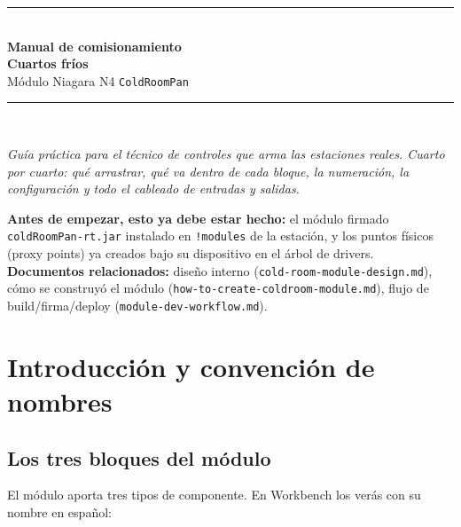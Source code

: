 \documentclass[11pt,a4paper]{article}
\newcommand{\code}[1]{\texttt{#1}}
\begin{document}
\begin{titlepage}
\centering
\vspace*{2.2cm}
{\color{frio}\rule{\linewidth}{2pt}}\\[10pt]
{\Huge\bfseries\color{tinta} Manual de comisionamiento}\\[10pt]
{\LARGE\bfseries\color{frio} Cuartos fríos}\\[6pt]
{\large\color{gris} Módulo Niagara N4 \code{ColdRoomPan}}\\[8pt]
{\color{frio}\rule{\linewidth}{2pt}}\\[26pt]

\begin{minipage}{0.82\linewidth}\color{gris}\itshape\centering
Guía práctica para el técnico de controles que arma las estaciones reales.
Cuarto por cuarto: qué arrastrar, qué va dentro de cada bloque, la numeración,
la configuración y todo el cableado de entradas y salidas.
\end{minipage}

\vfill
\begin{minipage}{0.9\linewidth}\small\color{gris}
\textbf{Antes de empezar, esto ya debe estar hecho:} el módulo firmado
\code{coldRoomPan-rt.jar} instalado en \code{!modules} de la estación, y los puntos
físicos (proxy points) ya creados bajo su dispositivo en el árbol de drivers.\\[6pt]
\textbf{Documentos relacionados:} diseño interno (\code{cold-room-module-design.md}),
cómo se construyó el módulo (\code{how-to-create-coldroom-module.md}),
flujo de build/firma/deploy (\code{module-dev-workflow.md}).
\end{minipage}
\vspace{1.4cm}
\end{titlepage}

\tableofcontents
\clearpage

\section{Introducción y convención de nombres}

\subsection{Los tres bloques del módulo}
El módulo aporta tres tipos de componente. En Workbench los verás con su nombre en español:
\end{document}
